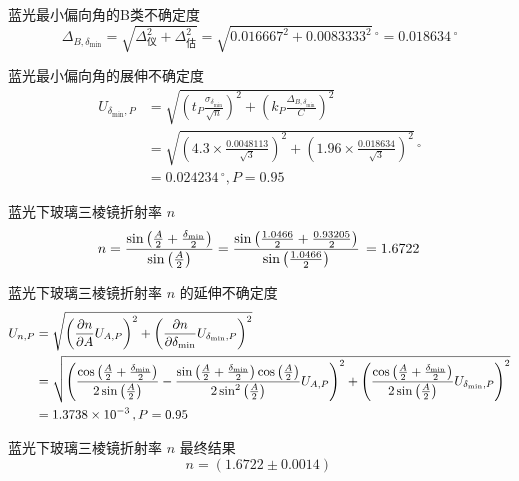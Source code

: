 \documentclass[10pt,a4paper]{article}	%
\begin{document}
	蓝光最小偏向角的B类不确定度
	$$
	\Delta_{B,{\delta_{\min}}}=\sqrt{\Delta_\text{仪}^2+\Delta_\text{估}^2}=\sqrt{0.016667^2+0.0083333^2}\,\mathrm{^{\circ}}=0.018634\,\mathrm{^{\circ}}
	$$

	蓝光最小偏向角的展伸不确定度
	$$
	\begin{aligned}
	U_{{\delta_{\min}},P}&=\sqrt{\left(t_P\frac{\sigma_{{\delta_{\min}}}}{\sqrt{n}}\right)^2+\left(k_P\frac{\Delta_{B,{\delta_{\min}}}}{C}\right)^2}\\
	&=\sqrt{\left(4.3\times\frac{0.0048113}{\sqrt{3}}\right)^2+\left(1.96\times\frac{0.018634}{\sqrt{3}}\right)^2}\,\mathrm{^{\circ}}\\
	&=0.024234\,\mathrm{^{\circ}},P=0.95
	\end{aligned}
	$$
	
	蓝光下玻璃三棱镜折射率 $n$
	$$
	n=\frac{\sin{\left(\frac{A}{2} + \frac{\delta_{\rm min}}{2} \right)}}{\sin{\left(\frac{A}{2} \right)}}=\frac{\sin{\left(\frac{1.0466}{2}+\frac{0.93205}{2}\right)}}{\sin{\left(\frac{1.0466}{2}\right)}}\,\mathrm{}=1.6722\,\mathrm{}
	$$

	蓝光下玻璃三棱镜折射率 $n$ 的延伸不确定度
	$$
	\begin{aligned}
		U_{n,P}&=\sqrt{\left(\frac{\partial n}{\partial A}U_{A,P}\right)^2+\left(\frac{\partial n}{\partial \delta_{\rm min}}U_{\delta_{\rm min},P}\right)^2}\\
		&=\sqrt{\left(\frac{\cos{\left(\frac{A}{2} + \frac{\delta_{\rm min}}{2} \right)}}{2 \sin{\left(\frac{A}{2} \right)}} - \frac{\sin{\left(\frac{A}{2} + \frac{\delta_{\rm min}}{2} \right)} \cos{\left(\frac{A}{2} \right)}}{2 \sin^{2}{\left(\frac{A}{2} \right)}}U_{A,P}\right)^2+\left(\frac{\cos{\left(\frac{A}{2} + \frac{\delta_{\rm min}}{2} \right)}}{2 \sin{\left(\frac{A}{2} \right)}}U_{\delta_{\rm min},P}\right)^2}\\
		&=1.3738 \times 10^{-3}\,\mathrm{},P=0.95
	\end{aligned}
	$$

	蓝光下玻璃三棱镜折射率 $n$ 最终结果
	$$
	n=\left(1.6722 \pm 0.0014\right)\,\mathrm{}
	$$
	
\end{document}
